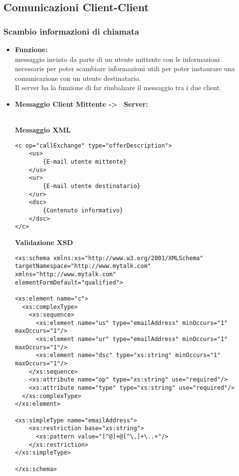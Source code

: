 \subsection{Comunicazioni Client-Client}{

	\subsubsection{Scambio informazioni di chiamata}{
	\label{opCExg}
		\begin{itemize}
			\item[] \textbf{Funzione:}{\\
				messaggio inviato da parte di un utente mittente con le informazioni necessarie per poter scambiare informazioni utili per poter instaurare una comunicazione con un utente destinatario.\\
				Il server ha la funzione di far rimbalzare il messaggio tra i due client.
				}
			
			\item[] \textbf{Messaggio Client Mittente -\textgreater~ Server:}{\\
			\textbf{Messaggio XML}\\
				\begin{lstlisting}
<c op="callExchange" type="offerDescription">
	<us>
		{E-mail utente mittente}
	</us>
	<ur>
		{E-mail utente destinatario}
	</ur>
	<dsc>
		{Contenuto informativo}
	</dsc>
</c>
				\end{lstlisting}
				\textbf{Validazione XSD}\\
				\begin{lstlisting}
<xs:schema xmlns:xs="http://www.w3.org/2001/XMLSchema"
targetNamespace="http://www.mytalk.com"
xmlns="http://www.mytalk.com"
elementFormDefault="qualified">

<xs:element name="c">
  <xs:complexType>
    <xs:sequence>
      <xs:element name="us" type="emailAddress" minOccurs="1" maxOccurs="1"/>
      <xs:element name="ur" type="emailAddress" minOccurs="1" maxOccurs="1"/>
      <xs:element name="dsc" type="xs:string" minOccurs="1" maxOccurs="1"/>
    </xs:sequence>
    <xs:attribute name="op" type="xs:string" use="required"/>
    <xs:attribute name="type" type="xs:string" use="required"/>
  </xs:complexType>
</xs:element>

<xs:simpleType name="emailAddress"> 
    <xs:restriction base="xs:string"> 
      <xs:pattern value="[^@]+@[^\.]+\..+"/> 
    </xs:restriction> 
</xs:simpleType> 

</xs:schema>
				\end{lstlisting}
				}
				

\end{itemize}}}
